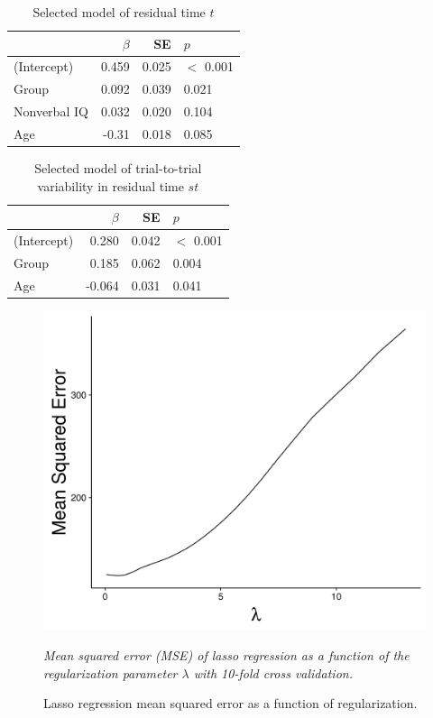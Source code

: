 \documentclass[..\uwthesis.tex]{subfiles}
\begin{document}
 
\begin{table}
\centering
\caption{Selected model of residual time $t$}
\label{tab:sb_grpt}
    \begin{tabular}{lrrl}
    \toprule
      & $\beta$ & SE & $p$\\
    \midrule
    (Intercept)      & 0.459  & 0.025 & $<$ 0.001\\
    Group            & 0.092  & 0.039 & 0.021\\
    Nonverbal IQ     & 0.032  & 0.020 & 0.104\\
    Age              & -0.31 & 0.018 & 0.085\\
    \bottomrule
    \end{tabular}
\end{table}

\begin{table}
\centering
\caption{Selected model of trial-to-trial variability in residual time $st$}
\label{tab:sb_grpst}
    \begin{tabular}{lrrl}
    \toprule
      & $\beta$ & SE & $p$\\
    \midrule
    (Intercept)      & 0.280  & 0.042 & $<$ 0.001\\
    Group            & 0.185  & 0.062 & 0.004\\
    Age              & -0.064 & 0.031 & 0.041\\
    \bottomrule
    \end{tabular}
\end{table}


\begin{figure}
    \centering
    \caption{Lasso regression mean squared error as a function of regularization.}
    \label{fig:suppb_3}
    \includegraphics[width = 12 cm]{images/appendix_b/S3_lasso_MSE.png}
    \item \textit{Mean squared error (MSE) of lasso regression as a function of the regularization parameter $\lambda$ with 10-fold cross validation.}
\end{figure}
\end{document}
